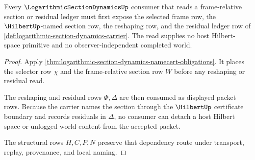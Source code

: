 \begin{theorem}
\label{thm:logarithmic-section-dynamics-no-host-hilbert-escape}
Every $\LogarithmicSectionDynamicsUp$ consumer that reads a frame-relative section or residual ledger must first expose the selected frame row, the $\HilbertUp$-named section row, the reshaping row, and the residual ledger row of \autoref{def:logarithmic-section-dynamics-carrier}. The read supplies no host Hilbert-space primitive and no observer-independent completed world.
\end{theorem}
\begin{proof}
Apply \autoref{thm:logarithmic-section-dynamics-namecert-obligations}. It places the selector row $\chi$ and the frame-relative section row $W$ before any reshaping or residual read.

The reshaping and residual rows $\Phi,\Delta$ are then consumed as displayed packet rows. Because the carrier names the section through the $\HilbertUp$ certificate boundary and records residuals in $\Delta$, no consumer can detach a host Hilbert space or unlogged world content from the accepted packet.

The structural rows $H,C,P,N$ preserve that dependency route under transport, replay, provenance, and local naming.
\end{proof}




